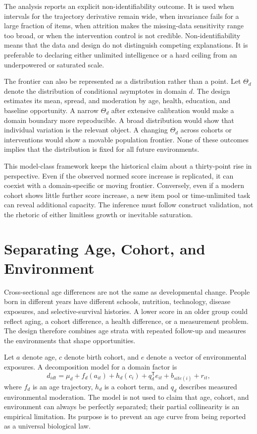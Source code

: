 \documentclass[conference]{IEEEtran}
\begin{document}
The analysis reports an explicit non-identifiability outcome. It is used when intervals for the trajectory derivative remain wide, when invariance fails for a large fraction of items, when attrition makes the missing-data sensitivity range too broad, or when the intervention control is not credible. Non-identifiability means that the data and design do not distinguish competing explanations. It is preferable to declaring either unlimited intelligence or a hard ceiling from an underpowered or saturated scale.

The frontier can also be represented as a distribution rather than a point. Let $\Theta_d$ denote the distribution of conditional asymptotes in domain $d$. The design estimates its mean, spread, and moderation by age, health, education, and baseline opportunity. A narrow $\Theta_d$ after extensive calibration would make a domain boundary more reproducible. A broad distribution would show that individual variation is the relevant object. A changing $\Theta_d$ across cohorts or interventions would show a movable population frontier. None of these outcomes implies that the distribution is fixed for all future environments.

This model-class framework keeps the historical claim about a thirty-point rise in perspective. Even if the observed normed score increase is replicated, it can coexist with a domain-specific or moving frontier. Conversely, even if a modern cohort shows little further score increase, a new item pool or time-unlimited task can reveal additional capacity. The inference must follow construct validation, not the rhetoric of either limitless growth or inevitable saturation.

\section{Separating Age, Cohort, and Environment}
\label{sec:decomposition}
Cross-sectional age differences are not the same as developmental change. People born in different years have different schools, nutrition, technology, disease exposures, and selective-survival histories. A lower score in an older group could reflect aging, a cohort difference, a health difference, or a measurement problem. The design therefore combines age strata with repeated follow-up and measures the environments that shape opportunities.

Let $a$ denote age, $c$ denote birth cohort, and $e$ denote a vector of environmental exposures. A decomposition model for a domain factor is
\begin{equation}
d_{idt}=\mu_d+f_d(a_{it})+h_d(c_i)+q_d^{\mathsf T}e_{it}+b_{site(i)}+r_{it},
\label{eq:ace}
\end{equation}
where $f_d$ is an age trajectory, $h_d$ is a cohort term, and $q_d$ describes measured environmental moderation. The model is not used to claim that age, cohort, and environment can always be perfectly separated; their partial collinearity is an empirical limitation. Its purpose is to prevent an age curve from being reported as a universal biological law.
\end{document}
